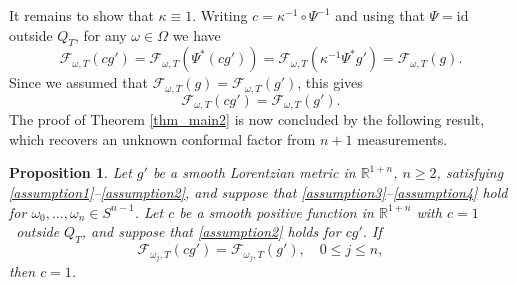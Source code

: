 \documentclass[11pt,letterpaper]{amsart}
\newtheorem{Proposition}[Theorem]{Proposition}
\theoremstyle{definition}
\numberwithin{equation}{section}
\newcommand{\mR}{\mathbb{R}}                    %
\newcommand{\id}{\mathrm{id}}
\begin{document}
It remains to show that $\kappa \equiv 1$. Writing $c = \kappa^{-1} \circ \Psi^{-1}$ and using that $\Psi = \id$ outside $Q_T$, for any $\omega \in \Omega$ we have 
\[
\mathcal{F}_{\omega,T}(c g') = \mathcal{F}_{\omega,T}(\Psi^*(c g')) = \mathcal{F}_{\omega,T}(\kappa^{-1} \Psi^* g') = \mathcal{F}_{\omega,T}(g).
\]
Since we assumed that $\mathcal{F}_{\omega,T}(g) = \mathcal{F}_{\omega,T}(g')$, this gives 
\[
\mathcal{F}_{\omega,T}(c g') = \mathcal{F}_{\omega,T}(g').
\]
The proof of Theorem \ref{thm_main2} is now concluded by the following result, which recovers an unknown conformal factor from $n+1$ measurements.

\begin{Proposition}\label{prop_conformal_factor}
Let $g'$ be a smooth Lorentzian metric in $\mR^{1+n}$, $n \ge 2$, satisfying \eqref{assumption1}--\eqref{assumption2}, and suppose that \eqref{assumption3}--\eqref{assumption4} hold for $\omega_0, \ldots, \omega_n \in S^{n-1}$. Let $c$ be a smooth positive function in $\mR^{1+n}$ with $c = 1$ outside $Q_T$, and suppose that \eqref{assumption2} holds for $c g'$. If 
\[
\mathcal{F}_{\omega_j,T}(c g') = \mathcal{F}_{\omega_j,T}(g'), \quad 0 \leq j \leq n,
\]
then $c = 1$.
\end{Proposition}
\end{document}
